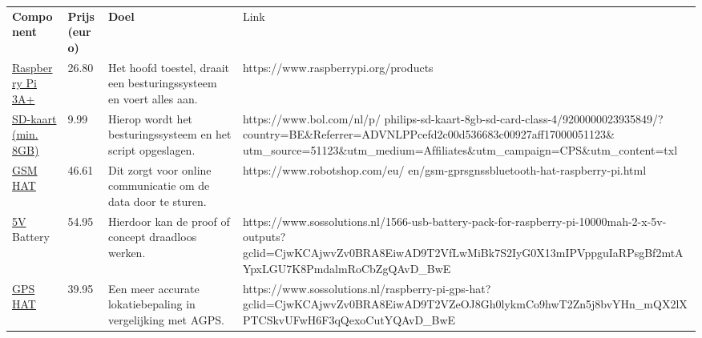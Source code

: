 \begin{table}[]
	\begin{tabular}{llll}
		\textbf{Component}           & \textbf{Prijs (euro)} & \textbf{Doel}                                                                & Link                                                                                                                                                                                                                             \\
		\href{https://www.raspberrypi.org/products}{Raspberry Pi 3A+}    & 26.80        & Het hoofd toestel, draait een besturingssysteem en voert alles aan. & https://www.raspberrypi.org/products                                                                                                                                                                                             \\
		\href{https://www.bol.com/nl/p/ philips-sd-kaart-8gb-sd-card-class-4/9200000023935849/?country=BE\&Referrer=ADVNLPPcefd2c00d536683c00927aff17000051123\& utm\_source=51123\&utm\_medium=Afﬁliates\&utm\_campaign=CPS\&utm\_content=txl}{SD-kaart (min. 8GB)} & 9.99         & Hierop wordt het besturingssysteem en het script opgeslagen.        & https://www.bol.com/nl/p/ philips-sd-kaart-8gb-sd-card-class-4/9200000023935849/?country=BE\&Referrer=ADVNLPPcefd2c00d536683c00927aff17000051123\& utm\_source=51123\&utm\_medium=Afﬁliates\&utm\_campaign=CPS\&utm\_content=txl \\
		\href{https://www.robotshop.com/eu/ en/gsm-gprsgnssbluetooth-hat-raspberry-pi.html}{GSM HAT}             & 46.61        & Dit zorgt voor online communicatie om de data door te sturen.       & https://www.robotshop.com/eu/ en/gsm-gprsgnssbluetooth-hat-raspberry-pi.html                                                                                                                                                     \\
		\href{https://www.sossolutions.nl/1566-usb-battery-pack-for-raspberry-pi-10000mah-2-x-5v-outputs?gclid=CjwKCAjwvZv0BRA8EiwAD9T2VfLwMiBk7S2IyG0X13mIPVppguIaRPsgBf2mtAYpxLGU7K8PmdalmRoCbZgQAvD\_BwE}{5V} Battery          & 54.95        & Hierdoor kan de proof of concept draadloos werken.                  & https://www.sossolutions.nl/1566-usb-battery-pack-for-raspberry-pi-10000mah-2-x-5v-outputs?gclid=CjwKCAjwvZv0BRA8EiwAD9T2VfLwMiBk7S2IyG0X13mIPVppguIaRPsgBf2mtAYpxLGU7K8PmdalmRoCbZgQAvD\_BwE                                    \\
		\href{https://www.sossolutions.nl/raspberry-pi-gps-hat?gclid=CjwKCAjwvZv0BRA8EiwAD9T2VZeOJ8Gh0lykmCo9hwT2Zn5j8bvYHn\_mQX2lXPTCSkvUFwH6F3qQexoCutYQAvD\_BwE}{GPS HAT}             & 39.95        & Een meer accurate lokatiebepaling in vergelijking met AGPS.         & https://www.sossolutions.nl/raspberry-pi-gps-hat?gclid=CjwKCAjwvZv0BRA8EiwAD9T2VZeOJ8Gh0lykmCo9hwT2Zn5j8bvYHn\_mQX2lXPTCSkvUFwH6F3qQexoCutYQAvD\_BwE                                                                             \\

\end{tabular}
\end{table}
